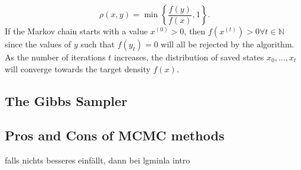 \documentclass[12pt]{book}
\begin{document}
\begin{equation*}
     \rho\left(x,y\right) = \min\left\lbrace\frac{f\left(y\right)}{f\left(x\right)}, 1\right\rbrace.
\end{equation*}
If the Markov chain starts with a value $x^{(0)} > 0$, then $f\left(x^{(t)}\right) > 0 \forall t\in\mathbb{N}$ since the values of $y$ such that $f\left(y_t\right) = 0$ will all be rejected by the algorithm. As the number of iterations $t$ increases, the distribution of saved states $x_0,...,x_t$ will converge towards the target density $f(x)$.  \autocite[Cf.][]{robert2013monte}
\subsection{The Gibbs Sampler}
\subsection{Pros and Cons of MCMC methods}
falls nichts besseres einfällt, dann bei lgminla intro
\end{document}

